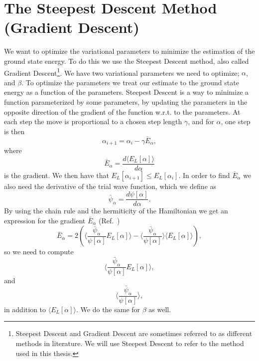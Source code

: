 \documentclass[../main.tex]{subfiles}
\begin{document}
\section{The Steepest Descent Method (Gradient Descent)}\label{sec:SteepestDescent}
We want to optimize the variational parameters to minimize the estimation of the ground state energy. To do this we use the Steepest Descent method, also called Gradient Descent\footnote{Steepest Descent and Gradient Descent are sometimes referred to as different methods in literature. We will use Steepest Descent to refer to the method used in this thesis.}. We have two variational parameters we need to optimize; $\alpha$, and $\beta$. To optimize the parameters we treat our estimate to the ground state energy as a function of the parameters. Steepest Descent is a way to minimize a function parameterized by some parameters, by updating the parameters in the opposite direction of the gradient of the function w.r.t. to the parameters.\cite{Ruder}
At each step the move is proportional to a chosen step length $\gamma$, and for $\alpha$, one step is then
\begin{equation}\label{eq: SteepestDesc}
    \alpha_{i+1} = \alpha_i - \gamma\bar{E}_\alpha,
\end{equation}
where
\begin{equation}
    \bar{E}_\alpha = \frac{d\langle E_L[\alpha]\rangle}{d\alpha}
\end{equation}
is the gradient. We then have that $E_L[\alpha_{i+1}]\leq E_L[\alpha_i]$. In order to find $\bar{E}_\alpha$ we also need the derivative of the trial wave function, which we define as
\begin{equation}
    \bar{\psi}_\alpha = \frac{d\psi[\alpha]}{d\alpha}.
\end{equation}
By using the chain rule and the hermiticity of the Hamiltonian we get an expression for the gradient $\bar{E}_\alpha$ (Ref.~\cite{FYS4411-LectureNotes})
\begin{equation}\label{eq: energygradient}
 \bar{E}_\alpha = 2 \left( \Bigr\langle \frac{\bar{\psi}_\alpha}{\psi[\alpha]} E_L[\alpha] \Bigr\rangle 
 - \Bigr\langle \frac{\bar{\psi}_\alpha}{\psi[\alpha]}\Bigr\rangle \langle E_L[\alpha] \rangle   \right),
\end{equation}
so we need to compute
\begin{equation}\label{eq: psiDerEn}
    \Bigr\langle \frac{\bar{\psi}_\alpha}{\psi[\alpha]} E_L[\alpha] \Bigr\rangle,
\end{equation}
and
\begin{equation}\label{eq: psiDer}
    \Bigr\langle \frac{\bar{\psi}_\alpha}{\psi[\alpha]}\Bigr\rangle,
\end{equation}
in addition to $\langle E_L[\alpha] \rangle$. We do the same for $\beta$ as well.
\end{document}
